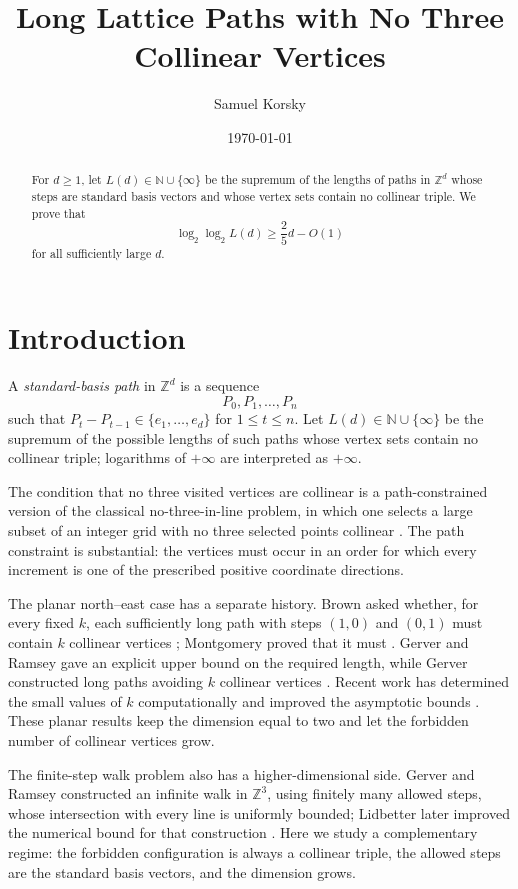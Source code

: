 \documentclass[11pt]{article}
\title{Long Lattice Paths with No Three Collinear Vertices}
\author{Samuel Korsky}
\date{\today}
\theoremstyle{plain}
\theoremstyle{definition}
\theoremstyle{remark}
\newcommand{\N}{\mathbb N}
\newcommand{\Z}{\mathbb Z}
\begin{document}
\maketitle

\begin{abstract}
\noindent
For \(d\ge 1\), let \(L(d)\in\N\cup\{\infty\}\) be the supremum of the lengths of paths in \(\Z^d\) whose steps are standard basis vectors and whose vertex sets contain no collinear triple. We prove that
\[
        \log_2\log_2 L(d)\ge \frac{2}{5}d-O(1)
\]
for all sufficiently large \(d\).
\end{abstract}

\section{Introduction}

A \emph{standard-basis path} in \(\Z^d\) is a sequence
\[
        P_0,P_1,\ldots,P_n
\]
such that \(P_t-P_{t-1}\in\{e_1,\ldots,e_d\}\) for \(1\le t\le n\). Let \(L(d)\in\N\cup\{\infty\}\) be the supremum of the possible lengths of such paths whose vertex sets contain no collinear triple; logarithms of \(+\infty\) are interpreted as \(+\infty\).

The condition that no three visited vertices are collinear is a path-constrained version of the classical no-three-in-line problem, in which one selects a large subset of an integer grid with no three selected points collinear \cite{GuyKelly1968,BrassMoserPach2005}. The path constraint is substantial: the vertices must occur in an order for which every increment is one of the prescribed positive coordinate directions.

The planar north--east case has a separate history. Brown asked whether, for every fixed \(k\), each sufficiently long path with steps \((1,0)\) and \((0,1)\) must contain \(k\) collinear vertices \cite{Brown1971}; Montgomery proved that it must \cite{Montgomery1972}. Gerver and Ramsey gave an explicit upper bound on the required length, while Gerver constructed long paths avoiding \(k\) collinear vertices \cite{Gerver1979,GerverRamsey1979}. Recent work has determined the small values of \(k\) computationally and improved the asymptotic bounds \cite{BarnoffBright2026,Korsky2026}. These planar results keep the dimension equal to two and let the forbidden number of collinear vertices grow.

The finite-step walk problem also has a higher-dimensional side. Gerver and Ramsey constructed an infinite walk in \(\Z^3\), using finitely many allowed steps, whose intersection with every line is uniformly bounded; Lidbetter later improved the numerical bound for that construction \cite{GerverRamsey1979,Lidbetter2024}. Here we study a complementary regime: the forbidden configuration is always a collinear triple, the allowed steps are the standard basis vectors, and the dimension grows.
\end{document}

